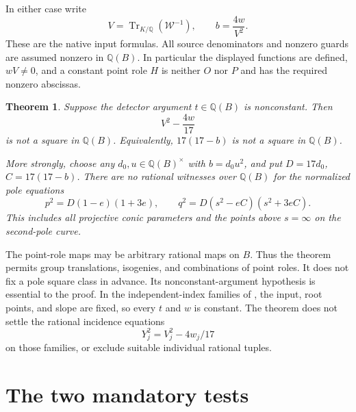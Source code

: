 \documentclass[11pt,a4paper]{article}
\newtheorem{theorem}{Theorem}[section]
\theoremstyle{remark}\newtheorem{remark}[theorem]{Remark}
\newcommand{\Q}{\mathbb Q}\newcommand{\Qbar}{\overline{\mathbb Q}}
\DeclareMathOperator{\Tr}{Tr}\DeclareMathOperator{\Res}{Res}
\begin{document}
In either case write
\begin{equation}\label{eq:input}
        V=\Tr_{K/\Q}(\mathcal W^{-1}),\qquad b=\frac{4w}{V^2}.
\end{equation}
These are the native input formulas. All source denominators and
nonzero guards are assumed nonzero in $\Q(B)$. In particular the
displayed functions are defined, $wV\ne0$, and a constant point role
$H$ is neither $O$ nor $P$ and has the required nonzero abscissas.

\begin{theorem}\label{thm:main}
Suppose the detector argument $t\in\Q(B)$ is nonconstant.
Then
\[
                     V^2-\frac{4w}{17}
\]
is not a square in $\Q(B)$. Equivalently, $17(17-b)$ is not a
square in $\Q(B)$.

More strongly, choose any $d_0,u\in\Q(B)^\times$ with $b=d_0u^2$,
and put $D=17d_0$, $C=17(17-b)$. There are no rational witnesses
over $\Q(B)$ for the normalized pole equations
\begin{equation}\label{eq:poles}
 p^2=D(1-e)(1+3e),\qquad
 q^2=D(s^2-eC)(s^2+3eC).
\end{equation}
This includes all projective conic parameters and the points above
$s=\infty$ on the second-pole curve.
\end{theorem}

The point-role maps may be arbitrary rational maps on $B$. Thus the
theorem permits group translations, isogenies, and combinations of
point roles. It does not fix a pole square class in advance. Its
nonconstant-argument hypothesis is essential to the proof. In the
independent-index families of \cite{Returns}, the input, root points,
and slope are fixed, so every $t$ and $w$ is constant. The theorem
does not settle the rational incidence equations
\[
                      Y_j^2=V_j^2-4w_j/17
\]
on those families, or exclude suitable individual rational tuples.

\section{The two mandatory tests}
\end{document}

